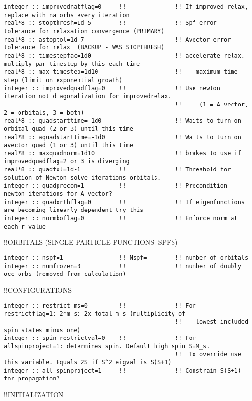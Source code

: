 \begin{verbatim}
integer :: improvednatflag=0     !!              !! If improved relax, replace with natorbs every iteration
real*8 :: stopthresh=1d-5        !!              !! Spf error tolerance for relaxation convergence (PRIMARY)
real*8 :: astoptol=1d-7                          !! Avector error tolerance for relax  (BACKUP - WAS STOPTHRESH)
real*8 :: timestepfac=1d0                        !! accelerate relax. multiply par_timestep by this each time
real*8 :: max_timestep=1d10                      !!    maximum time step (limit on exponential growth)
integer :: improvedquadflag=0    !!              !! Use newton iteration not diagonalization for improvedrelax.
                                                 !!     (1 = A-vector, 2 = orbitals, 3 = both)
real*8 :: quadstarttime=-1d0                     !! Waits to turn on orbital quad (2 or 3) until this time
real*8 :: aquadstarttime=-1d0                    !! Waits to turn on avector quad (1 or 3) until this time
real*8 :: maxquadnorm=1d10                       !! brakes to use if improvedquadflag=2 or 3 is diverging
real*8 :: quadtol=1d-1           !!              !! Threshold for solution of Newton solve iterations orbitals.
integer :: quadprecon=1          !!              !! Precondition newton iterations for A-vector?
integer :: quadorthflag=0        !!              !! If eigenfunctions are becoming linearly dependent try this
integer :: normboflag=0          !!              !! Enforce norm at each r value
\end{verbatim}
!!{\large \quad ORBITALS (SINGLE PARTICLE FUNCTIONS, SPFS)}
\begin{verbatim}
integer :: nspf=1                !! Nspf=        !! number of orbitals
integer :: numfrozen=0           !!              !! number of doubly occ orbs (removed from calculation)
\end{verbatim}
!!{\large \quad CONFIGURATIONS}
\begin{verbatim}
integer :: restrict_ms=0         !!              !! For restrictflag=1: 2*m_s: 2x total m_s (multiplicity of 
                                                 !!    lowest included spin states minus one)
integer :: spin_restrictval=0    !!              !! For allspinproject=1: determines spin. Default high spin S=M_s.
                                                 !!  To override use this variable. Equals 2S if S^2 eigval is S(S+1)
integer :: all_spinproject=1     !!              !! Constrain S(S+1) for propagation?
\end{verbatim}
!!{\large \quad INITIALIZATION}

